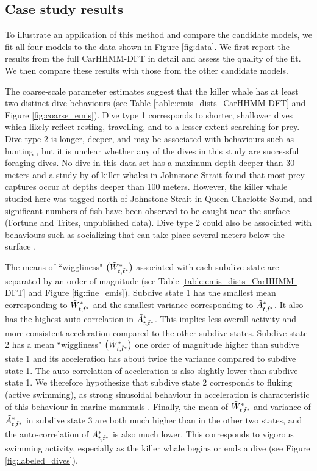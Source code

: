 \subsection{Case study results}

To illustrate an application of this method and compare the candidate models, we fit all four models to the data shown in Figure \ref{fig:data}. We first report the results from the full CarHHMM-DFT in detail and assess the quality of the fit. We then compare these results with those from the other candidate models.

The coarse-scale parameter estimates suggest that the killer whale has at least two distinct dive behaviours (see Table \ref{table:emis_dists_CarHHMM-DFT} and Figure \ref{fig:coarse_emis}). 
Dive type 1 corresponds to shorter, shallower dives which likely reflect resting, travelling, and to a lesser extent searching for prey.
Dive type 2 is longer, deeper, and may be associated with behaviours such as hunting  \citep{Tennessen:2019b}, but it is unclear whether any of the dives in this study are successful foraging dives. No dive in this data set has a maximum depth deeper than 30 meters and a study by \citet{Wright:2017} of killer whales in Johnstone Strait found that most prey captures occur at depths deeper than 100 meters. However, the killer whale studied here was tagged north of Johnstone Strait in Queen Charlotte Sound, and significant numbers of fish have been observed to be caught near the surface (Fortune and Trites, unpublished data). Dive type 2 could also be associated with behaviours such as socializing that can take place several meters below the surface \citep{Tennessen:2019b}.

The means of ``wiggliness" $\big(\tilde{W}^*_{t,\tilde t^*}\big)$ associated with each subdive state are separated by an order of magnitude (see Table \ref{table:emis_dists_CarHHMM-DFT} and Figure \ref{fig:fine_emis}). 
Subdive state 1 has the smallest mean corresponding to $\tilde{W}^*_{t,\tilde t^*}$ and the smallest variance corresponding to $\tilde{A}^*_{t,\tilde t^*}$. It also has the highest auto-correlation in $\tilde{A}^*_{t,\tilde t^*}$. This implies less overall activity and more consistent acceleration compared to the other subdive states. 
Subdive state 2 has a mean ``wiggliness" $\big(\tilde{W}^*_{t,\tilde t^*}\big)$ one order of magnitude higher than subdive state 1 and its acceleration has about twice the variance compared to subdive state 1. The auto-correlation of acceleration is also slightly lower than subdive state 1. We therefore hypothesize that subdive state 2 corresponds to fluking (active swimming), as strong sinusoidal behaviour in acceleration is characteristic of this behaviour in marine mammals \citep{Simon:2012}.
Finally, the mean of $\tilde{W}^*_{t,\tilde t^*}$ and variance of $\tilde{A}^*_{t,\tilde t^*}$ in subdive state 3 are both much higher than in the other two states, and the auto-correlation of $\tilde{A}^*_{t,\tilde t^*}$ is also much lower. This corresponds to vigorous swimming activity, especially as the killer whale begins or ends a dive (see Figure \ref{fig:labeled_dives}). 

